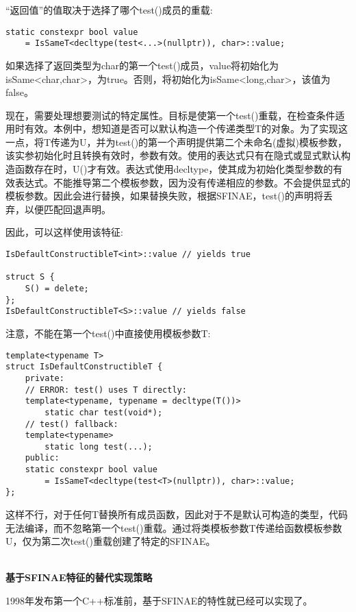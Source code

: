 “返回值”的值取决于选择了哪个test()成员的重载:

\begin{lstlisting}[style=styleCXX]
static constexpr bool value
	= IsSameT<decltype(test<...>(nullptr)), char>::value;
\end{lstlisting}

如果选择了返回类型为char的第一个test()成员，value将初始化为isSame<char,char>，为true。否则，将初始化为isSame<long,char>，该值为false。

现在，需要处理想要测试的特定属性。目标是使第一个test()重载，在检查条件适用时有效。本例中，想知道是否可以默认构造一个传递类型T的对象。为了实现这一点，将T传递为U，并为test()的第一个声明提供第二个未命名(虚拟)模板参数，该实参初始化时且转换有效时，参数有效。使用的表达式只有在隐式或显式默认构造函数存在时，U()才有效。表达式使用decltype，使其成为初始化类型参数的有效表达式。不能推导第二个模板参数，因为没有传递相应的参数。不会提供显式的模板参数。因此会进行替换，如果替换失败，根据SFINAE，test()的声明将丢弃，以便匹配回退声明。

因此，可以这样使用该特征:

\begin{lstlisting}[style=styleCXX]
IsDefaultConstructibleT<int>::value // yields true

struct S {
	S() = delete;
};
IsDefaultConstructibleT<S>::value // yields false
\end{lstlisting}

注意，不能在第一个test()中直接使用模板参数T:

\begin{lstlisting}[style=styleCXX]
template<typename T>
struct IsDefaultConstructibleT {
	private:
	// ERROR: test() uses T directly:
	template<typename, typename = decltype(T())>
		static char test(void*);
	// test() fallback:
	template<typename>
		static long test(...);
	public:
	static constexpr bool value
		= IsSameT<decltype(test<T>(nullptr)), char>::value;
};
\end{lstlisting}

这样不行，对于任何T替换所有成员函数，因此对于不是默认可构造的类型，代码无法编译，而不忽略第一个test()重载。通过将类模板参数T传递给函数模板参数U，仅为第二次test()重载创建了特定的SFINAE。

\hspace*{\fill} \\ %
\noindent
\textbf{基于SFINAE特征的替代实现策略}

1998年发布第一个C++标准前，基于SFINAE的特性就已经可以实现了。

